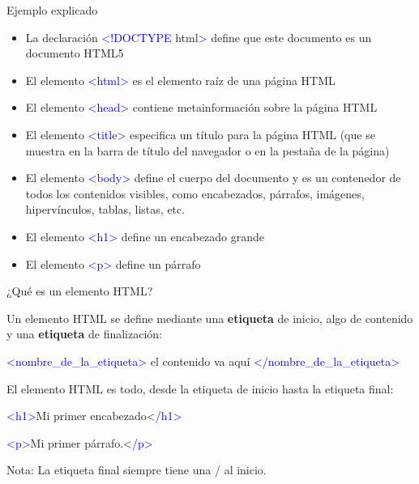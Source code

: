 \begin{frame}[c]{Ejemplo explicado}
  \begin{itemize}
    \item La declaración \textcolor{blue}{<!DOCTYPE} html\textcolor{blue}{>}
      define que este documento es un documento HTML5
    \pausa
    \item El elemento \textcolor{blue}{<html>} es el elemento raíz
      de una página HTML
    \pausa
    \item El elemento \textcolor{blue}{<head>} contiene metainformación
      sobre la página HTML
    \pausa
    \item El elemento \textcolor{blue}{<title>} especifica un título para
      la página HTML (que se muestra en la barra de título del navegador o
      en la pestaña de la página)
    \pausa
    \item El elemento \textcolor{blue}{<body>} define el cuerpo del
      documento y es un contenedor de todos los contenidos visibles, como
      encabezados, párrafos, imágenes, hipervínculos, tablas, listas, etc.
    \pausa
    \item El elemento \textcolor{blue}{<h1>} define un encabezado grande
    \pausa
    \item El elemento \textcolor{blue}{<p>} define un párrafo
  \end{itemize}
\end{frame}


\begin{frame}[c]{¿Qué es un elemento HTML?}

  Un elemento HTML se define mediante una \textbf{etiqueta} de inicio,
  algo de contenido y una \textbf{etiqueta} de finalización:

  \vspace{\baselineskip}
  \textcolor{blue}{<nombre\_de\_la\_etiqueta>} el contenido va aquí
  \textcolor{blue}{</nombre\_de\_la\_etiqueta>}

  \pausa
  \vspace{\baselineskip}
  El elemento HTML es todo, desde la etiqueta de inicio hasta la
  etiqueta final:

  \vspace{\baselineskip}
  \textcolor{blue}{<h1>}Mi primer encabezado<\textcolor{blue}{/h1>}

  \vspace{\baselineskip}
  \textcolor{blue}{<p>}Mi primer párrafo.<\textcolor{blue}{/p>}

  \begin{exampleblock}{Nota:}
    La etiqueta final siempre tiene una / al inicio.
  \end{exampleblock}

\end{frame}


